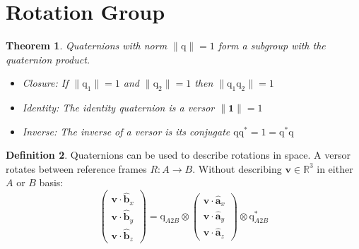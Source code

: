 \documentclass{amsart}
\newtheorem{theorem}{Theorem}[section]
\theoremstyle{definition}
\newtheorem{definition}[theorem]{Definition}
\theoremstyle{remark}
\numberwithin{equation}{section}
\begin{document}
\section{Rotation Group}

\begin{theorem}
  Quaternions with norm $\|\mathrm{q}\|=1$ form a subgroup with the quaternion product.
  \begin{itemize}
  \item Closure: If $\|\mathrm{q}_1\|=1$ and $\|\mathrm{q}_2\|=1$ then $\|\mathrm{q}_1\mathrm{q}_2\|=1$
  \item Identity: The identity quaternion is a versor $\|\mathbf{1}\|=1$
  \item Inverse: The inverse of a versor is its conjugate $\mathrm{q}\mathrm{q}^*=1=\mathrm{q}^*\mathrm{q}$
  \end{itemize}
\end{theorem}


\begin{definition}
  Quaternions can be used to describe rotations in space. A versor rotates between reference frames $R:A\to B$. Without describing $\mathbf{v}\in\mathbb{R}^3$ in either $A$ or $B$ basis:
  \begin{equation}
    \begin{pmatrix}
      \mathbf{v} \cdot \mathbf{\hat{b}}_x \\
      \mathbf{v} \cdot \mathbf{\hat{b}}_y \\
      \mathbf{v} \cdot \mathbf{\hat{b}}_z
    \end{pmatrix}
    = \mathrm{q}_{A2B} \otimes
    \begin{pmatrix}
      \mathbf{v} \cdot \mathbf{\hat{a}}_x \\
      \mathbf{v} \cdot \mathbf{\hat{a}}_y \\
      \mathbf{v} \cdot \mathbf{\hat{a}}_z
    \end{pmatrix}
    \otimes \mathrm{q}_{A2B}^*
  \end{equation}
\end{definition}
\end{document}
